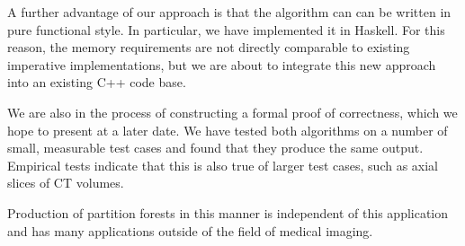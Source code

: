 \documentclass{article}
\begin{document}
A further advantage of our approach is that the algorithm can can be
written in pure functional style. In particular, we have implemented
it in Haskell. For this reason, the memory requirements are not
directly comparable to existing imperative implementations, but we are
about to integrate this new approach into an existing C++ code base.

We are also in the process of constructing a formal proof of
correctness, which we hope to present at a later date. We have tested
both algorithms on a number of small, measurable test cases and found
that they produce the same output. Empirical tests indicate that this
is also true of larger test cases, such as axial slices of CT volumes.

Production of partition forests in this manner is independent of this
application and has many applications outside of the field of medical
imaging.


\begin{thebibliography}{2}
 	





\end{thebibliography}
\end{document}
